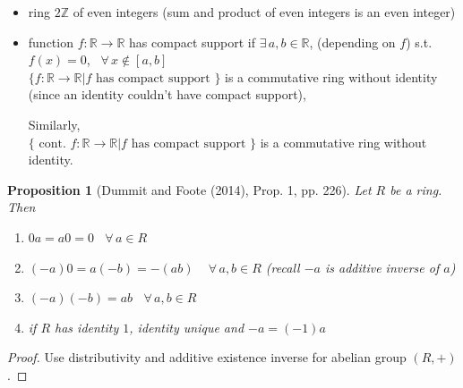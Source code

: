\documentclass[10pt]{amsart}
\newtheorem{proposition}{Proposition}
\begin{document}
\begin{multicols*}{2}
\begin{enumerate}
\begin{itemize}
	\item  ring $2\mathbb{Z}$ of even integers (sum and product of even integers is an even integer) \\
\item function $f: \mathbb{R} \to \mathbb{R}$ has compact support if $\exists \, a, b \in \mathbb{R}$, (depending on $f$) s.t. $f(x) = 0$, \quad \, $\forall \, x \notin [a,b]$ \\
$\lbrace f: \mathbb{R}\to \mathbb{R} | f \text{ has compact support } \rbrace$ is a commutative ring without identity (since an identity couldn't have compact support), 

Similarly, \\
$\lbrace \text{ cont. } f : \mathbb{R} \to \mathbb{R} | f \text{ has compact support } \rbrace$ is a commutative ring without identity. 
\end{itemize}	
\end{enumerate}

\begin{proposition}[Dummit and Foote (2014)\cite{DuFo2003}, Prop. 1, pp. 226]
Let $R$ be a ring. \\
Then
\begin{enumerate}
	\item $0a = a0 = 0$ \, $\forall \, a \in R$ 
	\item $(-a) 0 = a(-b) = -(ab) \quad \, \forall \, a,b \in R$ (recall $-a$ is additive inverse of $a$)
	\item $(-a)(-b) =ab$ \quad \, $\forall \, a, b \in R$ 
	\item if $R$ has identity $1$, identity unique and $-a = (-1) a$
\end{enumerate}
\end{proposition}

\begin{proof}
Use distributivity and additive existence inverse for abelian group $(R, +)$. 


\end{proof}
\end{multicols*}
\end{document}
